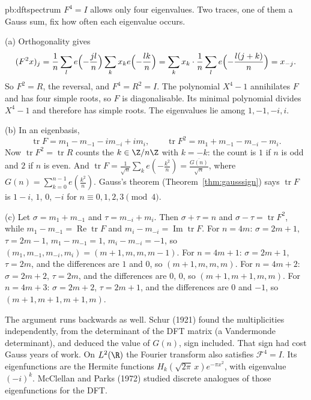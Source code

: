 \begin{solution}{pb:dftspectrum}
\idea $F^4=I$ allows only four eigenvalues. Two traces, one of them a Gauss sum, fix how often each eigenvalue occurs.

\writeup (a) Orthogonality gives
\[
(F^2x)_j=\frac1n\sum_le\Bigl(-\frac{jl}n\Bigr)\sum_kx_ke\Bigl(-\frac{lk}n\Bigr)=\sum_kx_k\cdot\frac1n\sum_le\Bigl(-\frac{l(j+k)}n\Bigr)=x_{-j}.
\]
So $F^2=R$, the reversal, and $F^4=R^2=I$. The polynomial $X^4-1$ annihilates $F$ and has four simple roots, so $F$ is diagonalisable. Its
minimal polynomial divides $X^4-1$ and therefore has simple roots. The eigenvalues lie among $1,-1,-i,i$.

(b) In an eigenbasis,
\[
\operatorname{tr}F=m_1-m_{-1}-im_{-i}+im_i,\qquad\operatorname{tr}F^2=m_1+m_{-1}-m_{-i}-m_i.
\]
Now $\operatorname{tr}F^2=\operatorname{tr}R$ counts the $k\in\Z/n\Z$ with $k=-k$: the count is $1$ if $n$ is odd and $2$ if $n$ is even. And
$\operatorname{tr}F=\frac1{\sqrt n}\sum_ke(-\frac{k^2}n)=\frac{\overline{G(n)}}{\sqrt n}$, where $G(n)=\sum_{k=0}^{n-1}e(\frac{k^2}n)$. Gauss's theorem (Theorem~\ref{thm:gausssign}) says $\operatorname{tr}F$ is $1-i$, $1$, $0$, $-i$ for
$n\equiv0,1,2,3\pmod4$.

(c) Let $\sigma=m_1+m_{-1}$ and $\tau=m_{-i}+m_i$. Then $\sigma+\tau=n$ and $\sigma-\tau=\operatorname{tr}F^2$, while $m_1-m_{-1}=\operatorname{Re}\operatorname{tr}F$ and $m_i-m_{-i}=\operatorname{Im}\operatorname{tr}F$. For
$n=4m$: $\sigma=2m+1$, $\tau=2m-1$, $m_1-m_{-1}=1$, $m_i-m_{-i}=-1$, so $(m_1,m_{-1},m_{-i},m_i)=(m+1,m,m,m-1)$. For $n=4m+1$: $\sigma=2m+1$, $\tau=2m$,
and the differences are $1$ and $0$, so $(m+1,m,m,m)$. For $n=4m+2$: $\sigma=2m+2$, $\tau=2m$, and the differences are $0$, $0$, so $(m+1,m+1,m,m)$. For $n=4m+3$: $\sigma=2m+2$,
$\tau=2m+1$, and the differences are $0$ and $-1$, so $(m+1,m+1,m+1,m)$.

\leads The argument runs backwards as well. Schur (1921) found the multiplicities independently, from the determinant of the DFT
matrix (a Vandermonde determinant), and deduced the value of $G(n)$, sign included. That sign had cost Gauss years of work. On $L^2(\R)$ the
Fourier transform also satisfies $\mathcal F^4=I$. Its eigenfunctions are the Hermite functions $H_k(\sqrt{2\pi}\,x)e^{-\pi x^2}$, with eigenvalue $(-i)^k$.
McClellan and Parks (1972) studied discrete analogues of those eigenfunctions for the DFT.
\end{solution}

